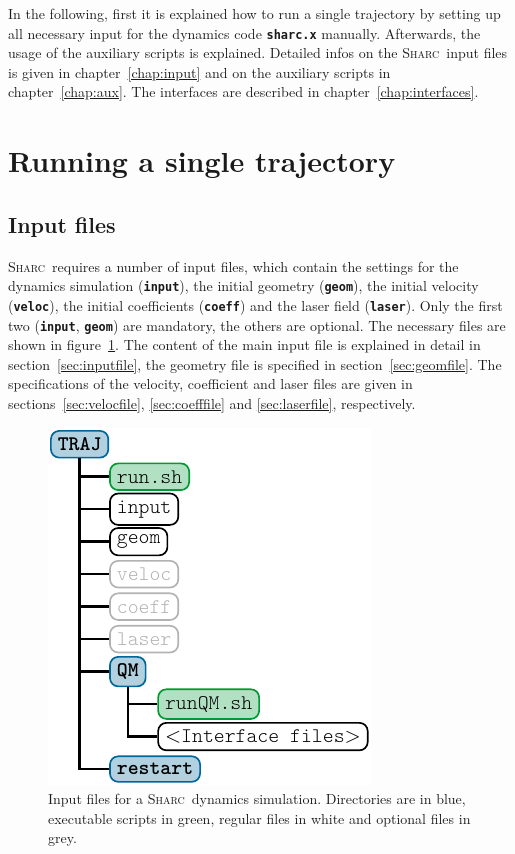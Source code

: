 \documentclass[a4paper,11pt,DIV=15,openany,twoside=false]{scrbook}
\newcommand{\sharc}{\textsc{Sharc}}
\newcommand{\ttt}[1]{\textbf{\texttt{#1}}}
\begin{document}
In the following, first it is explained how to run a single trajectory by setting up all necessary input for the dynamics code \ttt{sharc.x} manually. Afterwards, the usage of the auxiliary scripts is explained. Detailed infos on the \sharc\ input files is given in chapter~\ref{chap:input} and on the auxiliary scripts in chapter~\ref{chap:aux}. The interfaces are described in chapter~\ref{chap:interfaces}.

\section{Running a single trajectory}

\subsection{Input files}

\sharc\ requires a number of input files, which contain the settings for the dynamics simulation (\ttt{input}), the initial geometry (\ttt{geom}), the initial velocity (\ttt{veloc}), the initial coefficients (\ttt{coeff}) and the laser field (\ttt{laser}). Only the first two (\ttt{input}, \ttt{geom}) are mandatory, the others are optional. The necessary files are shown in figure~\ref{fig:dir_traj}. 
The content of the main input file is explained in detail in section~\ref{sec:inputfile}, the geometry file is specified in section~\ref{sec:geomfile}. The specifications of the velocity, coefficient and laser files are given in sections~\ref{sec:velocfile}, \ref{sec:coefffile} and \ref{sec:laserfile}, respectively.

\begin{figure}[h!]
  \centering
  \includegraphics[scale=1]{img/dir_traj/dir_traj.pdf}
  \caption{Input files for a \sharc\ dynamics simulation. Directories are in blue, executable scripts in green, regular files in white and optional files in grey.}
  \label{fig:dir_traj}
\end{figure}
\end{document}
